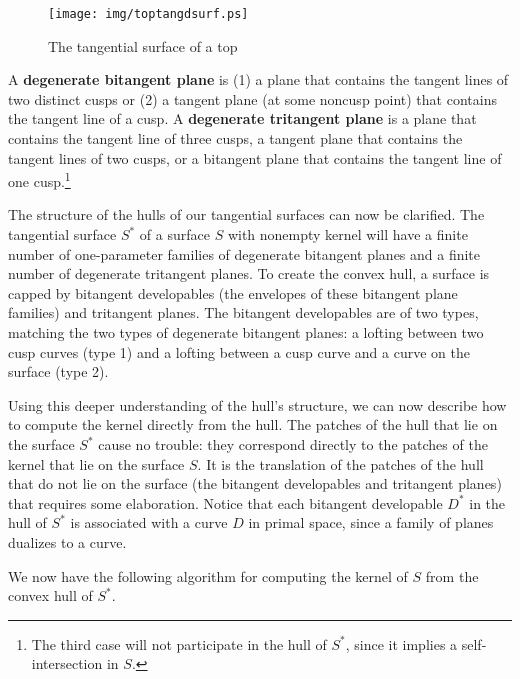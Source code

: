 \documentclass{acmsiggraph}
\begin{document}
\begin{figure}
\begin{center}
\texttt{[image: img/toptangdsurf.ps]}
\end{center}
\vskip -0.2in
\caption{The tangential surface of a top}
\label{fig:toptangdsurf}
\end{figure}

\begin{defn2}
A {\bf degenerate bitangent plane} is 
(1) a plane that contains the tangent lines of two distinct cusps or
(2) a tangent plane (at some noncusp point) that contains the tangent line of a cusp. 
A {\bf degenerate tritangent plane} is 
a plane that contains the tangent line of three cusps, 
a tangent plane that contains the tangent lines of two cusps,
or a bitangent plane that contains the tangent line of one cusp.\footnote{The
	third case will not participate in the hull of $S^*$, since
	it implies a self-intersection in $S$.}
\end{defn2}

The structure of the hulls of our tangential surfaces can now be clarified.
The tangential surface $S^*$ of a surface $S$ with nonempty kernel 
will have a finite number of one-parameter families of degenerate bitangent planes
and a finite number of degenerate tritangent planes.
To create the convex hull, a surface is capped by bitangent developables
(the envelopes of these bitangent plane families) and tritangent planes.
The bitangent developables
are of two types, matching the two types of degenerate bitangent planes: 
a lofting between two cusp curves (type 1) and
a lofting between a cusp curve and a curve on the surface (type 2).

Using this deeper understanding of the hull's structure,
we can now describe how to compute the kernel directly from the hull.
The patches of the hull that lie on the surface $S^*$
cause no trouble: they correspond directly
to the patches of the kernel that lie on the surface $S$.
It is the translation of the patches of the hull that do not lie on the surface 
(the bitangent developables and tritangent planes)
that requires some elaboration.
Notice that each bitangent developable $D^*$ in the hull of $S^*$ 
is associated with a curve $D$ in primal space, since a family of planes dualizes to a curve.

We now have the following algorithm for computing the kernel of $S$ 
from the convex hull of $S^*$.
\end{document}
